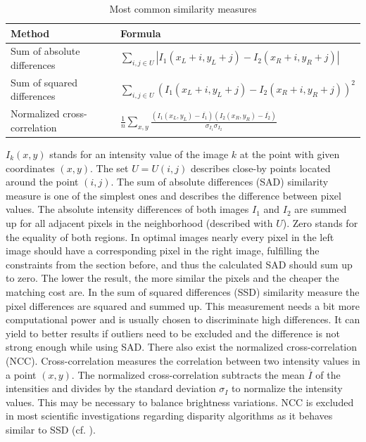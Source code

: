 \begin{table}[h!]
\centering
\begin{tabular}{l|l}
  \hline
  \textbf{Method} & \textbf{Formula} \\ \hline \hline
  Sum of absolute differences & $\displaystyle \sum_{i,j \in U} \left| I_1(x_L+i,y_L+j) - I_2(x_R+i,y_R+j) \right|$ \\
  Sum of squared differences & $\displaystyle \sum_{i,j \in U} (I_1(x_L+i,y_L+j) - I_2(x_R+i,y_R+j))^2$ \\
  Normalized cross-correlation & $\displaystyle \frac{1}{n} \sum_{x,y}\frac{(I_1(x_L,y_L) - \overline{I_1})(I_2(x_R,y_R) - \overline{I_2})}{\sigma_{I_1} \sigma_{I_2}}$ \\
  \hline
\end{tabular}
\caption{Most common similarity measures}
\label{tab:overview-matching-cost-functions}
\end{table}

\noindent $I_k(x,y)$ stands for an intensity value of the image $k$ at the point with given coordinates $(x,y)$.
The set $U = U(i,j)$ describes close-by points located around the point $(i,j)$.
The sum of absolute differences (SAD) similarity measure is one of the simplest ones and describes the difference between pixel values.
The absolute intensity differences of both images $I_1$ and $I_2$ are summed up for all adjacent pixels in the neighborhood (described with $U$).
Zero stands for the equality of both regions.
In optimal images nearly every pixel in the left image should have a corresponding pixel in the right image, fulfilling the constraints from the section before, and thus the calculated SAD should sum up to zero.
The lower the result, the more similar the pixels and the cheaper the matching cost are.
\newline\newline\noindent In the sum of squared differences (SSD) similarity measure the pixel differences are squared and summed up.
This measurement needs a bit more computational power and is usually chosen to discriminate high differences.
It can yield to better results if outliers need to be excluded and the difference is not strong enough while using SAD.
\newline\newline\noindent There also exist the normalized cross-correlation (NCC).
Cross-correlation measures the correlation between two intensity values in a point $(x,y)$.
The normalized cross-correlation subtracts the mean $\overline{I}$ of the intensities and divides by the standard deviation $\sigma_{I}$ to normalize the intensity values. This may be necessary to balance brightness variations.
NCC is excluded in most scientific investigations regarding disparity algorithms as it behaves similar to SSD (cf. \citep{hirschmuller2007evaluation, scharstein2002taxonomy, cyganek2011introduction}).

